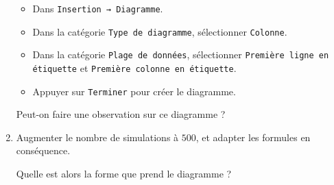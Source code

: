 \documentclass[
	classe=$2^{de}$
]{informatique}
\begin{document}
\begin{enumerate}
	      \begin{itemize}
		      \item Dans \texttt{Insertion → Diagramme}.
		      \item Dans la catégorie \texttt{Type de diagramme}, sélectionner \texttt{Colonne}.
		      \item Dans la catégorie \texttt{Plage de données}, sélectionner \texttt{Première ligne en étiquette} et \texttt{Première colonne en étiquette}.
		      \item Appuyer sur \texttt{Terminer} pour créer le diagramme.
	      \end{itemize}

	      Peut-on faire une observation sur ce diagramme ?
	\item Augmenter le nombre de simulations à $500$, et adapter les formules en conséquence.

	      Quelle est alors la forme que prend le diagramme ?
\end{enumerate}
\end{document}
